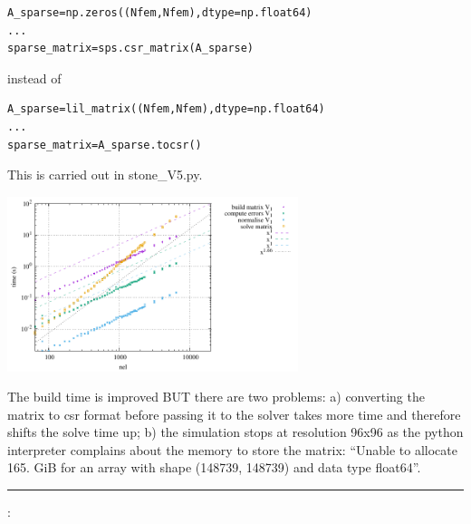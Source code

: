 \begin{lstlisting}
A_sparse=np.zeros((Nfem,Nfem),dtype=np.float64)
...
sparse_matrix=sps.csr_matrix(A_sparse)
\end{lstlisting}
instead of 
\begin{lstlisting}
A_sparse=lil_matrix((Nfem,Nfem),dtype=np.float64)
...
sparse_matrix=A_sparse.tocsr()
\end{lstlisting}
This is carried out in {\pythonfile stone\_V5.py}. 
\begin{center}
\includegraphics[width=8.5cm]{python_codes/fieldstone_150/results/times_V5}
\end{center}
The build time is improved BUT there are two problems: a) converting the matrix to csr 
format before passing it to the solver takes more time and therefore shifts the solve
time up; b) the simulation stops at resolution 96x96 as the python interpreter complains 
about the memory to store the matrix:
``Unable to allocate 165. GiB for an array with shape (148739, 148739) and data type float64''.


\par\noindent\rule{\textwidth}{0.4pt}

\vspace{.5cm}

\begin{center}
\end{center}

\vspace{.5cm}

\Literature:\\


